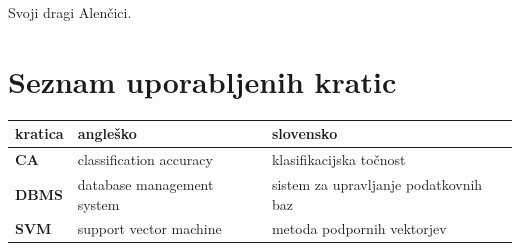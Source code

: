 \documentclass[a4paper, 12pt]{book}
\newcommand{\clearemptydoublepage}{\newpage{\pagestyle{empty}\cleardoublepage}}
\begin{document}
\clearemptydoublepage

\thispagestyle{empty}\mbox{}{\textheight}\mbox{}\hfill\begin{minipage}{0.55\textwidth}%
Svoji dragi Alenčici.
\normalfont\end{minipage}

\clearemptydoublepage


\pagestyle{empty}
\def\thepage{}%
\tableofcontents{}


\clearemptydoublepage


\chapter*{Seznam uporabljenih kratic}  %

\noindent\begin{tabular}{p{}|p{}|p{}}    %
  {\bf kratica} & {\bf angleško}                             & {\bf slovensko} \\ \hline
  {\bf CA}      & classification accuracy               & klasifikacijska točnost \\
  {\bf DBMS} & database management system & sistem za upravljanje podatkovnih baz \\
  {\bf SVM}   & support vector machine              & metoda podpornih vektorjev \\
\end{tabular}
\end{document}
